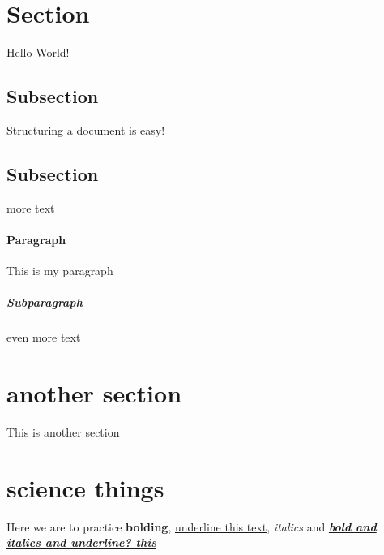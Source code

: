 \documentclass{article}
\begin{document}
	\section{Section}
	Hello World!
	\subsection{Subsection}
	Structuring a document is easy!
	\subsection{Subsection}
	more text
	\paragraph{Paragraph}
	This is my paragraph
	\subparagraph{Subparagraph}
	even more text
	\section{another section}
	This is another section
	\section{science things}
	Here we are to practice \textbf{bolding}, \underline{underline this text}, \textit{italics} and \textbf{\textit{\underline {bold and italics and underline? this}}} 
\end{document}

